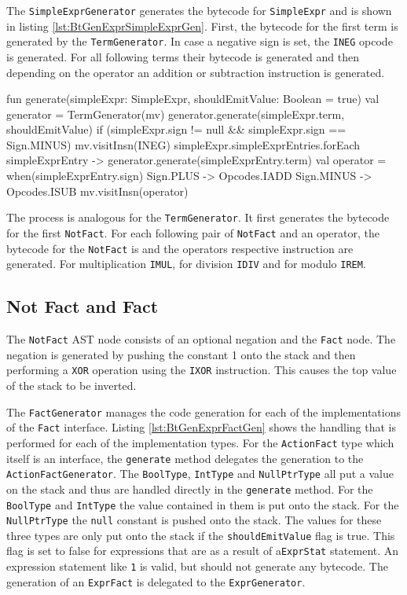 The \verb|SimpleExprGenerator| generates the bytecode for \verb|SimpleExpr| and is shown in listing \ref{lst:BtGenExprSimpleExprGen}. First, the bytecode for the first term is generated by the \verb|TermGenerator|. In case a negative sign is set, the \verb|INEG| opcode is generated. For all following terms their bytecode is generated and then depending on the operator an addition or subtraction instruction is generated.   

\begin{KotlinCode}[float,numbers=none,caption=Implementation of the \texttt{generate} method of the \texttt{SimpleExprGenerator}., label=lst:BtGenExprSimpleExprGen]
fun generate(simpleExpr: SimpleExpr, shouldEmitValue: Boolean = true) {
    val generator = TermGenerator(mv)
    generator.generate(simpleExpr.term, shouldEmitValue)
    if (simpleExpr.sign != null && simpleExpr.sign == Sign.MINUS) {
        mv.visitInsn(INEG)
    }
    simpleExpr.simpleExprEntries.forEach { simpleExprEntry ->
        generator.generate(simpleExprEntry.term)
        val operator = when(simpleExprEntry.sign) {
            Sign.PLUS -> Opcodes.IADD
            Sign.MINUS -> Opcodes.ISUB
        }
        mv.visitInsn(operator)
    }
}
\end{KotlinCode}

The process is analogous for the \verb|TermGenerator|. It first generates the bytecode for the first \verb|NotFact|. For each following pair of \verb|NotFact| and an operator, the bytecode for the \verb|NotFact| is and the operators respective instruction are generated. For multiplication \verb|IMUL|, for division \verb|IDIV| and for modulo \verb|IREM|.

\subsection{Not Fact and Fact}

The \verb|NotFact| AST node consists of an optional negation and the \verb|Fact| node. The negation is generated by pushing the constant 1 onto the stack and then performing a \verb|XOR| operation using the \verb|IXOR| instruction. This causes the top value of the stack to be inverted. 

The \verb|FactGenerator| manages the code generation for each of the implementations of the \verb|Fact| interface. Listing \ref{lst:BtGenExprFactGen} shows the handling that is performed for each of the implementation types. For the \verb|ActionFact| type which itself is an interface, the \verb|generate| method delegates the generation to the \verb|ActionFactGenerator|. The \verb|BoolType|, \verb|IntType| and \verb|NullPtrType| all put a value on the stack and thus are handled directly in the \verb|generate| method. For the \verb|BoolType| and \verb|IntType| the value contained in them is put onto the stack. For the \verb|NullPtrType| the \verb|null| constant is pushed onto the stack. The values for these three types are only put onto the stack if the \verb|shouldEmitValue| flag is true. This flag is set to false for expressions that are as a result of a\verb|ExprStat| statement. An expression statement like \verb|1| is valid, but should not generate any bytecode. The generation of an \verb|ExprFact| is delegated to the \verb|ExprGenerator|. 

